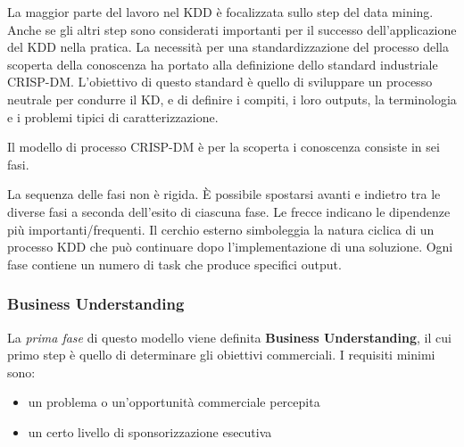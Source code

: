 \documentclass[a4paper]{extarticle}
\begin{document}
La maggior parte del lavoro nel KDD è focalizzata sullo step del data mining. Anche se gli altri step sono considerati importanti per il successo dell'applicazione del KDD nella pratica. La necessità per una standardizzazione del processo della scoperta della conoscenza ha portato alla definizione dello standard industriale CRISP-DM. L'obiettivo di questo standard è quello di sviluppare un processo neutrale per condurre il KD,  e di definire i compiti, i loro outputs, la terminologia e i problemi tipici di caratterizzazione. 

Il modello di processo CRISP-DM è per la scoperta i conoscenza consiste in sei fasi.

\begin{center}


\end{center}

La sequenza delle fasi non è rigida. È possibile spostarsi avanti e indietro tra le diverse fasi a seconda dell'esito di ciascuna fase. Le frecce indicano le dipendenze più importanti/frequenti. Il cerchio esterno simboleggia la natura ciclica di un processo KDD che può continuare dopo l'implementazione di una soluzione. Ogni fase contiene un numero di task che produce specifici output.

\subsubsection{Business Understanding}

La \textit{prima fase} di questo modello viene definita \textbf{Business Understanding}, il cui primo step è quello di determinare gli obiettivi commerciali. I requisiti minimi sono:

\begin{itemize}
	\item un problema o un'opportunità commerciale percepita
	\item un certo livello di sponsorizzazione esecutiva
\end{itemize}
\end{document}
